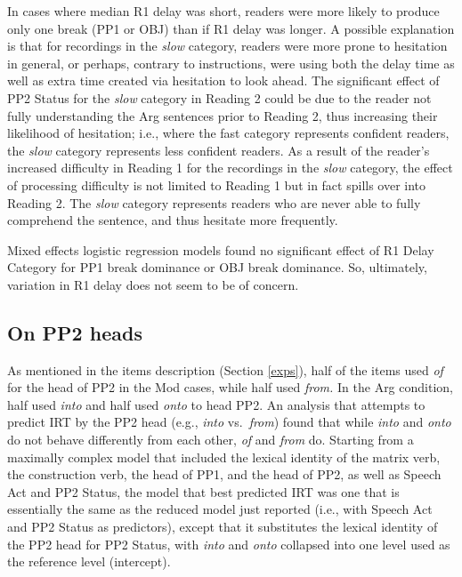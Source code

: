 \documentclass[11pt,oneside]{book}
\begin{document}
In cases where median R1 delay was short, readers were more likely to produce only one break (PP1 or OBJ) than if R1 delay was longer. A possible explanation is that for recordings in the \emph{slow} category, readers were more prone to hesitation in general, or perhaps, contrary to instructions, were using both the delay time as well as extra time created via hesitation to look ahead. The significant effect of PP2 Status for the \emph{slow} category in Reading 2 could be due to the reader not fully understanding the Arg sentences prior to Reading 2, thus increasing their likelihood of hesitation; i.e., where the fast category represents confident readers, the \emph{slow} category represents less confident readers. As a result of the reader's increased difficulty in Reading 1 for the recordings in the \emph{slow} category, the effect of processing difficulty is not limited to Reading 1 but in fact spills over into Reading 2. The \emph{slow} category represents readers who are never able to fully comprehend the sentence, and thus hesitate more frequently.

Mixed effects logistic regression models found no significant effect of R1 Delay Category for PP1 break dominance or OBJ break dominance. So, ultimately, variation in R1 delay does not seem to be of concern.

\hypertarget{pp2h}{%
\subsection{On PP2 heads}\label{pp2h}}

As mentioned in the items description (Section \ref{exps}), half of the items used \emph{of} for the head of PP2 in the Mod cases, while half used \emph{from.} In the Arg condition, half used \emph{into} and half used \emph{onto} to head PP2. An analysis that attempts to predict IRT by the PP2 head (e.g., \emph{into} vs.~\emph{from}) found that while \emph{into} and \emph{onto} do not behave differently from each other, \emph{of} and \emph{from} do. Starting from a maximally complex model that included the lexical identity of the matrix verb, the construction verb, the head of PP1, and the head of PP2, as well as Speech Act and PP2 Status, the model that best predicted IRT was one that is essentially the same as the reduced model just reported (i.e., with Speech Act and PP2 Status as predictors), except that it substitutes the lexical identity of the PP2 head for PP2 Status, with \emph{into} and \emph{onto} collapsed into one level used as the reference level (intercept).
\end{document}
